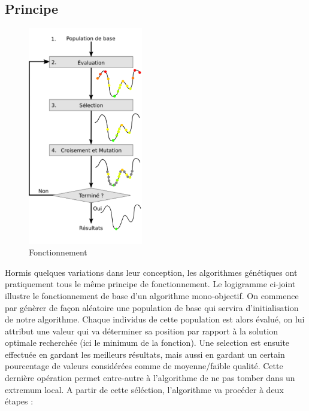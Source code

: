 \documentclass[12pt]{report}
\begin{document}
      \subsection{Principe}
        \begin{figure}
          \centering
          \includegraphics[width=5cm]{img/schema_algo_single.png}
          \caption{Fonctionnement}
        \end{figure}
        Hormis quelques variations dans leur conception, les algorithmes génétiques ont pratiquement tous le même principe de fonctionnement.
        Le logigramme ci-joint illustre le fonctionnement de base d'un algorithme mono-objectif.
        On commence par génèrer de façon aléatoire une population de base qui servira d'initialisation de notre algorithme.
        Chaque individus de cette population est alors évalué, on lui attribut une valeur qui va déterminer sa position par rapport à la solution optimale recherchée (ici le minimum de la fonction).
        Une selection est ensuite effectuée en gardant les meilleurs résultats, mais aussi en gardant un certain pourcentage de valeurs considérées comme de moyenne/faible qualité. Cette dernière opération permet entre-autre à l'algorithme de ne pas tomber dans un extremum local.
        A partir de cette séléction, l'algorithme va procéder à deux étapes :
\end{document}
